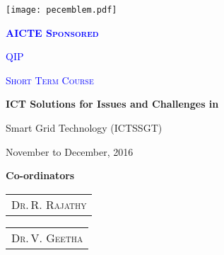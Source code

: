 \pagecolor{Bisque}
\begin{titlepage}
  \noindent
  \begin{minipage}{0.125\textwidth}
    \centering
    \texttt{[image: pecemblem.pdf]}
  \end{minipage}
  \hfill
  \begin{minipage}{0.6\textwidth}
    \begin{center}
        \onehalfspacing\LARGE\centering\bfseries
        \textcolor{blue}{\scshape AICTE Sponsored}

        \textcolor{blue}{\scshape QIP}

        \textcolor{blue}{\scshape Short Term Course}
    \end{center}
  \end{minipage}
  \hfill
  \begin{minipage}{0.17\textwidth}
    \centering
  \end{minipage}

  \begin{center}
    \huge\bfseries\color{DarkRed}
    ICT Solutions for Issues and Challenges in

    Smart Grid Technology (ICTSSGT)

    \vspace{5mm}
    \normalsize {} November  to  December, 2016
    \par
  \end{center}

  \begin{center}
    \Large\bfseries\color{Olive} Co-ordinators

    \vspace{5mm}\color{name}
    \begin{tabular}{c}
      \scshape\LARGE Dr.\,R. Rajathy
    \end{tabular}
    \hspace{1cm}
    \begin{tabular}{c}
      \scshape\LARGE Dr.\,V. Geetha
    \end{tabular}
  \end{center}


\end{titlepage}
